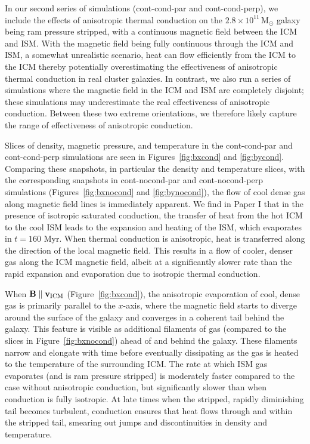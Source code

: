 \documentclass[twocolumn]{aastex6}
\newcommand{\msun}{\, \mbox{M}_{\odot}}
\begin{document}
In our second series of simulations (cont-cond-par and cont-cond-perp), we include the effects of anisotropic thermal conduction on the $2.8 \times 10^{11} \msun$ galaxy being ram pressure stripped, with a continuous magnetic field between the ICM and ISM. With the magnetic field being fully continuous through the ICM and ISM, a somewhat unrealistic scenario, heat can flow efficiently from the ICM to the ICM thereby potentially overestimating the effectiveness of anisotropic thermal conduction in real cluster galaxies. In contrast, we also run a series of simulations where the magnetic field in the ICM and ISM are completely disjoint; these simulations may underestimate the real effectiveness of anisotropic conduction. Between these two extreme orientations, we therefore likely capture the range of effectiveness of anisotropic conduction. 

Slices of density, magnetic pressure, and temperature in the cont-cond-par and cont-cond-perp simulations are seen in Figures~\ref{fig:bxcond} and \ref{fig:bycond}. Comparing these snapshots, in particular the density and temperature slices, with the corresponding snapshots in cont-nocond-par and cont-nocond-perp simulations (Figures~\ref{fig:bxnocond} and \ref{fig:bynocond}), the flow of cool dense gas along magnetic field lines is immediately apparent. We find in Paper I that in the presence of isotropic saturated conduction, the transfer of heat from the hot ICM to the cool ISM leads to the expansion and heating of the ISM, which evaporates in $t = 160$ Myr. When thermal conduction is anisotropic, heat is transferred along the direction of the local magnetic field. This results in a flow of cooler, denser gas along the ICM magnetic field, albeit at a significantly slower rate than the rapid expansion and evaporation due to isotropic thermal conduction. 

When $\mathbf{B} \parallel \mathbf{v_{\rm ICM}}$ (Figure~\ref{fig:bxcond}), the anisotropic evaporation of cool, dense gas is primarily parallel to the $x$-axis, where the magnetic field starts to diverge around the surface of the galaxy and converges in a coherent tail behind the galaxy. This feature is visible as additional filaments of gas (compared to the slices in Figure~\ref{fig:bxnocond}) ahead of and behind the galaxy. These filaments narrow and elongate with time before eventually dissipating as the gas is heated to the temperature of the surrounding ICM. The rate at which ISM gas evaporates (and is ram pressure stripped) is moderately faster compared to the case without anisotropic conduction, but significantly slower than when conduction is fully isotropic. At late times when the stripped, rapidly diminishing tail becomes turbulent, conduction ensures that heat flows through and within the stripped tail, smearing out jumps and discontinuities in density and temperature.
\end{document}
